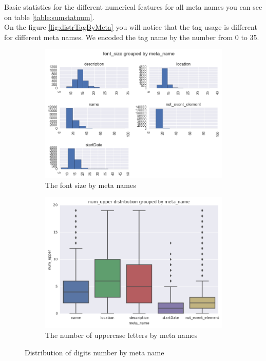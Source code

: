 Basic statistics for the different numerical features for all meta names you can see on table \ref{table:sumstatnum}.\\

On the figure \ref{fig:distrTagByMeta} you will notice that the tag usage is different for different meta names. We encoded the tag name by the number from 0 to 35.  

\begin{figure}[H]
\begin{subfigure}{.5\textwidth}
  \centering
  \includegraphics[width=1\textwidth]{figures07/distrFontSizeByMeta}
  \caption{The font size by meta names}
  \label{fig:distrFontSizeByMeta}
\end{subfigure}
\begin{subfigure}{.5\textwidth}
  \centering
    \includegraphics[width=1\textwidth]{figures07/boxUpperByMeta}
    \caption{The number of uppercase letters by meta names}
    \label{fig:boxUpperByMeta}
\end{subfigure}
\caption{Distribution of digits number by meta name}
\end{figure}

